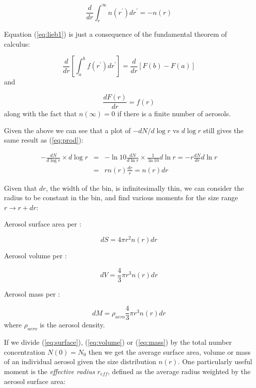\documentclass[12pt]{article}
\begin{document}
\begin{equation}
  \label{eq:lieb1}
  \frac{d}{dr} \int_r^\infty n(r^\prime) dr^\prime = -n(r)
\end{equation}

Equation (\ref{eq:lieb1}) is just a consequence of the fundamental theorem of calculus:

\begin{equation}
  \label{eq:fund}
   \frac{d}{dr}\left [ \int_a^b f(r^\prime) dr^\prime \right ] = \frac{d}{dr}\left [ F(b) - F(a) \right ]
\end{equation}
and

\begin{equation}
  \label{eq:fund2}
   \frac{dF(r)}{dr} =  f(r)
\end{equation}
along with the fact that $n(\infty)=0$ if there is a finite number of aerosols.


Given the above we can see that a plot of $-dN/d\log r$ vs $d\log r$ still
gives the same result as (\ref{eq:prod}):

\begin{eqnarray}
  \label{eq:same}
  -\frac{dN}{d\log r} \times d\log r &=& -\ln 10 \frac{dN}{d\ln r} \times 
      \frac{1}{\ln 10} d \ln r = - r \frac{dN}{d r} d \ln r \nonumber\\
        & = & r n(r) \frac{dr}{r} = n(r) dr
\end{eqnarray}

Given that  $dr$, the width of the bin, is infinitesimally thin, we can
consider the radius to be constant in the bin, and find various moments
for the size range $r \rightarrow r + dr$:

Aerosol surface area per \cc:

\begin{equation}
  \label{eq:surface}
dS=  4 \pi r^2 n(r) dr
\end{equation}

Aerosol volume per \cc:

\begin{equation}
  \label{eq:volume}
dV  = \frac{4}{3} \pi r^3 n(r) dr
\end{equation}

Aerosol mass per \cc:

\begin{equation}
  \label{eq:mass}
dM  = \rho_{aero} \frac{4}{3} \pi r^3 n(r) dr
\end{equation}
where $\rho_{aero}$ is the aerosol density.

If we divide (\ref{eq:surface}), (\ref{eq:volume}) or (\ref{eq:mass})
by the total number concentration $N(0)=N_0$ then we get the average
surface area, volume or mass of an individual aerosol given the size distribution
$n(r)$.  One particularly
useful moment is the \textit{effective radius} $r_{eff}$, defined as the average
radius weighted by the aerosol surface area:
\end{document}
